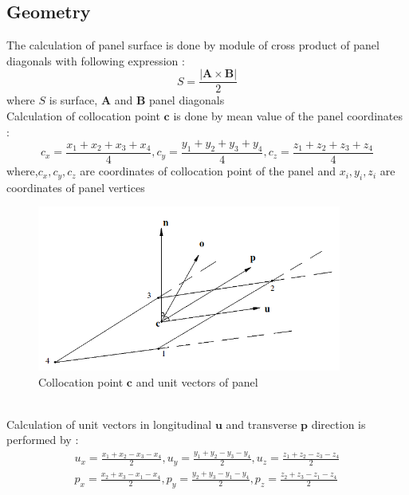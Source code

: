 \documentclass{article}
\begin{document}
\subsection{Geometry}
The calculation of panel surface is done by module of cross product of panel diagonals with following expression :
\begin{equation}
S = \frac{|\textbf{A}\times \textbf{B}|}{2}
\end{equation}
where $S$ is surface, $\textbf{A}$ and $\textbf{B}$ panel diagonals
\\ Calculation of collocation point $\textbf{c}$ is done by mean value of the panel coordinates :
\begin{equation}
c_x = \frac{x_1+x_2+x_3+x_4}{4} , c_y = \frac{y_1+y_2+y_3+y_4}{4} ,c_z = \frac{z_1+z_2+z_3+z_4}{4}
\end{equation}
where,$c_x,c_y,c_z$ are coordinates of collocation point of the panel and $x_i,y_i,z_i$ are coordinates of panel vertices 
\begin{figure}[ht]
	\centering
	\includegraphics[width=100mm,scale=0.5]{panelvectors.png}
	\caption{Collocation point $\textbf{c}$ and unit vectors of panel}
	\label{fig:panelvector}
\end{figure}
\\ Calculation of unit vectors in longitudinal $\textbf{u}$ and transverse $\textbf{p}$ direction is performed by :
\begin{align}
u_x = \frac{x_1+x_2-x_3-x_4}{2},u_y = \frac{y_1+y_2-y_3-y_4}{2},u_z = \frac{z_1+z_2-z_3-z_4}{2}
\\ p_x = \frac{x_2+x_3-x_1-x_4}{2},p_y = \frac{y_2+y_3-y_1-y_4}{2},p_z = \frac{z_2+z_3-z_1-z_4}{2}
\end{align} 
 
\end{document}
